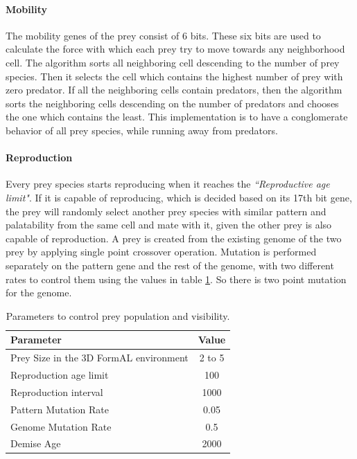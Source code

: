\documentclass[letterpaper]{article}
\numberwithin{equation}{section}
\begin{document}
\paragraph{Mobility}
The mobility genes of the prey consist of 6 bits. These six bits are used to calculate the force with which each prey try to move towards any neighborhood cell. The algorithm sorts all neighboring cell descending to the number of prey species. Then it selects the cell which contains the highest number of prey with zero predator. If all the neighboring cells contain predators, then the algorithm sorts the neighboring cells descending on the number of predators and chooses the one which contains the least. This implementation is to have a conglomerate behavior of all prey species, while running away from predators.

\paragraph{Reproduction}
Every prey species starts reproducing when it reaches the \textsl{``Reproductive age limit"}. If it is capable of reproducing, which is decided based on its 17th bit gene, the prey will randomly select another prey species with similar pattern and palatability from the same cell and mate with it, given the other prey is also capable of reproduction. A prey is created from the existing genome of the two prey by applying single point crossover operation. Mutation is performed separately on the pattern gene and the rest of the genome, with two different rates to control them using the values in table \ref{tab:prey-control-parameters}. So there is two point mutation for the genome. 

\begin{table}[h]
\small
\centering
\setlength\tabcolsep{2pt}
\begin{tabular}{| l | c |}
	\hline
		\textbf{Parameter} & \textbf{Value}\\ \hline
		Prey Size in the 3D FormAL environment & 2 to 5 \\ \hline
		Reproduction age limit & 100 \\ \hline
		Reproduction interval & 1000 \\ \hline
		Pattern Mutation Rate & 0.05 \\ \hline
		Genome Mutation Rate & 0.5 \\ \hline
		Demise Age & 2000 \\
	\hline
\end{tabular}
\caption{Parameters to control prey population and visibility.}
\label{tab:prey-control-parameters}
\end{table}
\end{document}
